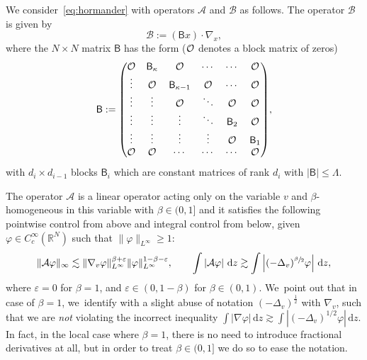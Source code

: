 \documentclass[10pt]{amsart}
\let\epsilon\varepsilon
\theoremstyle{definition}
\newcommand\R{{\mathbb R}}
\newcommand{\cA}{{\mathcal A}}
\newcommand{\cB}{{\mathcal B}}
\newcommand{\sB}{{\mathsf B}}
\newcommand{\dd}{{\, \mathrm d}}
\begin{document}
We consider~\eqref{eq:hormander} with operators $\cA$ and $\cB$
as follows. The operator $\cB$ is given by
\begin{equation*}
\cB := (\sB x) \cdot \nabla_x,
\end{equation*}
where the $N \times N$ matrix $\sB$ has the form (${\mathcal O}$ denotes a
block matrix of zeros)
\begin{equation} \label{B_0}\arraycolsep5.5pt
\sB
:=
\begin{pmatrix}
\OO & \sB_\kappa & \OO & \cdots & \cdots & \OO \\
\vdots & \OO & \sB_{\kappa-1} & \OO & \cdots & \OO\\
\vdots & \vdots & \OO & \ddots & \OO & \OO \\
\vdots & \vdots & \vdots & \ddots & \sB_2 & \OO \\
\vdots & \vdots & \vdots & \vdots & \OO & \sB_1 \\
\OO & \OO & \cdots & \cdots & \cdots & \OO
\end{pmatrix}\!,
\end{equation}
with $d_{i} \times d_{i-1}$ blocks $\sB_i$ which are constant
matrices of rank $d_i$ with $|\sB|\leq \Lambda$.

The operator $\cA$ is a linear operator acting only on the
variable $v$ and $\beta$\nobreakdash-homogeneous in this variable with
$\beta \in (0,1]$ and it satisfies the following pointwise
control from above and integral control from below, given
$\varphi \in C^\infty_c(\R^N)$ such that $\| \varphi \|_{L^\infty}\geq 1$:
\begin{equation}
\label{eq:hypA}
\| \cA \varphi \|_\infty \lesssim \| \nabla_{v} \varphi
\|_{L^\infty} ^{\beta+\epsilon} \| \varphi \|_{L^\infty} ^{1-\beta-\epsilon}, \qquad
\int \left| \cA \varphi \right| \dd z \gtrsim
\int \left| (-\Delta_v)^{\sfrac{\beta}{2}} \varphi \right| \dd z,
\end{equation}
where $\epsilon = 0$ for $\beta = 1$, and $\epsilon \in (0, 1-\beta)$ for $\beta \in (0, 1)$. We~point out that in case of $\beta = 1$, we~identify with a slight abuse of notation $(-\Delta_{v})^{\frac{1}{2}}$ with $\nabla_{v}$, such that we are \textit{not} violating the incorrect inequality $\int \left| \nabla \varphi\right| \dd z \gtrsim \int \left| (-\Delta_v)^{1/2} \varphi \right| \dd z$. In fact, in the local case where $\beta = 1$, there is no need to introduce fractional derivatives at all, but in order to treat $\beta \in (0, 1]$ we do so to ease the notation.
\end{document}
